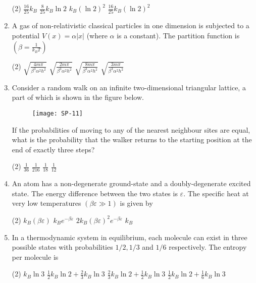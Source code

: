 \begin{enumerate}
{	}
 \begin{tasks}(2)
	\task[\textbf{a.}]$\frac{16}{25} k_{B}$
	\task[\textbf{b.}] $\frac{8}{25} k_{B} \ln 2$
	\task[\textbf{c.}]$k_{B}(\ln 2)^{2}$
	\task[\textbf{d.}]  $\frac{16}{25} k_{B}(\ln 2)^{2}$
\end{tasks}
\item A gas of non-relativistic classical particles in one dimension is subjected to a potential $V(x)=\alpha|x|$ (where $\alpha$ is a constant). The partition function is $\left(\beta=\frac{1}{k_{B} T}\right)$
{	}
 \begin{tasks}(2)
	\task[\textbf{a.}] $\sqrt{\frac{4 m \pi}{\beta^{3} \alpha^{2} h^{2}}}$
	\task[\textbf{b.}] $\sqrt{\frac{2 m \pi}{\beta^{3} \alpha^{2} h^{2}}}$
	\task[\textbf{c.}]$\sqrt{\frac{8 m \pi}{\beta^{3} \alpha^{2} h^{2}}}$
	\task[\textbf{d.}] $\sqrt{\frac{3 m \pi}{\beta^{3} \alpha^{2} h^{2}}}$
\end{tasks}
\item Consider a random walk on an infinite two-dimensional triangular lattice, a part of which is shown in the figure below.
\begin{figure}[H]
	\centering
	\texttt{[image: SP-11]}
\end{figure}
If the probabilities of moving to any of the nearest neighbour sites are equal, what is the probability that the walker returns to the starting position at the end of exactly three steps?
{	}
 \begin{tasks}(2)
	\task[\textbf{a.}]$\frac{1}{36}$
	\task[\textbf{b.}]$\frac{1}{216}$
	\task[\textbf{c.}] $\frac{1}{18}$
	\task[\textbf{d.}] $\frac{1}{12}$
\end{tasks}
\item 	An atom has a non-degenerate ground-state and a doubly-degenerate excited state. The energy difference between the two states is $\varepsilon$. The specific heat at very low temperatures $(\beta \varepsilon \gg 1)$ is given by
{	}
	 \begin{tasks}(2)
		\task[\textbf{a.}]$k_{B}(\beta \varepsilon)$
		\task[\textbf{b.}]$k_{B} e^{-\beta \varepsilon}$
		\task[\textbf{c.}] $2 k_{B}(\beta \varepsilon)^{2} e^{-\beta \varepsilon}$
		\task[\textbf{d.}]  $k_{B}$
	\end{tasks}
\item In a thermodynamic system in equilibrium, each molecule can exist in three possible states with probabilities $1 / 2,1 / 3$ and $1 / 6$ respectively. The entropy per molecule is
{	}
 \begin{tasks}(2)
	\task[\textbf{a.}] $k_{B} \ln 3$
	\task[\textbf{b.}]$\frac{1}{2} k_{B} \ln 2+\frac{2}{3} k_{B} \ln 3$
	\task[\textbf{c.}]$\frac{2}{3} k_{B} \ln 2+\frac{1}{2} k_{B} \ln 3$
	\task[\textbf{d.}] $\frac{1}{2} k_{B} \ln 2+\frac{1}{6} k_{B} \ln 3$
\end{tasks}
\end{enumerate}
